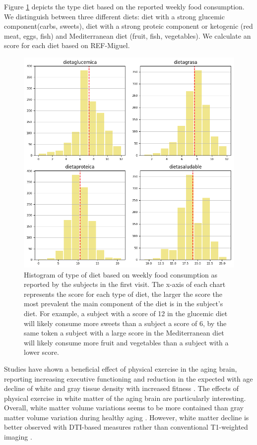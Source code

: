 \documentclass[11pt]{article}
\theoremstyle{definition}
\theoremstyle{remark}
\begin{document}
Figure \ref{fig:diet} depicts the type diet based on the reported weekly food consumption. We distinguish between three different diets: diet with a strong glucemic component(carbs, sweets), diet with a strong proteic component or ketogenic (red meat, eggs, fish) and Mediterranean diet (fruit, fish, vegetables). We calculate an score for each diet based on REF-Miguel.

\begin{figure}[H]
        \centering
        \includegraphics[keepaspectratio, width=.8\linewidth]{figures/Fig_diet}
        \caption{Histogram of type of diet based on weekly food consumption as reported by the subjects in the first visit. The x-axis of each chart represents the score for each type of diet, the larger the score the most prevalent the main component of the diet is in the subject's diet. For example, a subject with a score of 12 in the glucemic diet will likely consume more sweets than a subject a score of 6, by the same token a subject with a large score in the Mediterranean diet will likely consume more fruit and vegetables than a subject with a lower score.} 
        \label{fig:diet}
\end{figure}

Studies have shown a beneficial effect of physical exercise in the aging brain, reporting increasing executive functioning and reduction in the expected with age decline of white and gray tissue density with increased fitness \cite{colcombe2003aerobic}. The effects of physical exercise in white matter of the aging brain are particularly interesting. Overall, white matter volume variations seems to be more contained than gray matter volume variation during healthy aging \cite{bartzokis2003white}. However, white matter decline is better observed with DTI-based measures rather than conventional T1-weighted imaging \cite{giorgio2010age}.
\end{document}

